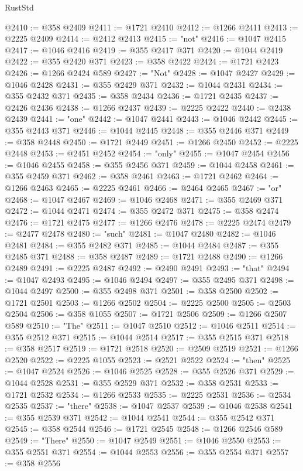\begin{lexlean}{RustStd}
\begin{coremodule}
@2410 := @358 @2409
@2411 := @1721 @2410
@2412 := @1266 @2411
@2413 := @2225 @2409
@2414 := @2412 @2413
@2415 := "not"
@2416 := @1047 @2415
@2417 := @1046 @2416
@2419 := @355 @2417 @371
@2420 := @1044 @2419
@2422 := @355 @2420 @371
@2423 := @358 @2422
@2424 := @1721 @2423
@2426 := @1266 @2424 @589
@2427 := "Not"
@2428 := @1047 @2427
@2429 := @1046 @2428
@2431 := @355 @2429 @371
@2432 := @1044 @2431
@2434 := @355 @2432 @371
@2435 := @358 @2434
@2436 := @1721 @2435
@2437 := @2426 @2436
@2438 := @1266 @2437
@2439 := @2225 @2422
@2440 := @2438 @2439
@2441 := "one"
@2442 := @1047 @2441
@2443 := @1046 @2442
@2445 := @355 @2443 @371
@2446 := @1044 @2445
@2448 := @355 @2446 @371
@2449 := @358 @2448
@2450 := @1721 @2449
@2451 := @1266 @2450
@2452 := @2225 @2448
@2453 := @2451 @2452
@2454 := "only"
@2455 := @1047 @2454
@2456 := @1046 @2455
@2458 := @355 @2456 @371
@2459 := @1044 @2458
@2461 := @355 @2459 @371
@2462 := @358 @2461
@2463 := @1721 @2462
@2464 := @1266 @2463
@2465 := @2225 @2461
@2466 := @2464 @2465
@2467 := "or"
@2468 := @1047 @2467
@2469 := @1046 @2468
@2471 := @355 @2469 @371
@2472 := @1044 @2471
@2474 := @355 @2472 @371
@2475 := @358 @2474
@2476 := @1721 @2475
@2477 := @1266 @2476
@2478 := @2225 @2474
@2479 := @2477 @2478
@2480 := "such"
@2481 := @1047 @2480
@2482 := @1046 @2481
@2484 := @355 @2482 @371
@2485 := @1044 @2484
@2487 := @355 @2485 @371
@2488 := @358 @2487
@2489 := @1721 @2488
@2490 := @1266 @2489
@2491 := @2225 @2487
@2492 := @2490 @2491
@2493 := "that"
@2494 := @1047 @2493
@2495 := @1046 @2494
@2497 := @355 @2495 @371
@2498 := @1044 @2497
@2500 := @355 @2498 @371
@2501 := @358 @2500
@2502 := @1721 @2501
@2503 := @1266 @2502
@2504 := @2225 @2500
@2505 := @2503 @2504
@2506 := @358 @1055
@2507 := @1721 @2506
@2509 := @1266 @2507 @589
@2510 := "The"
@2511 := @1047 @2510
@2512 := @1046 @2511
@2514 := @355 @2512 @371
@2515 := @1044 @2514
@2517 := @355 @2515 @371
@2518 := @358 @2517
@2519 := @1721 @2518
@2520 := @2509 @2519
@2521 := @1266 @2520
@2522 := @2225 @1055
@2523 := @2521 @2522
@2524 := "then"
@2525 := @1047 @2524
@2526 := @1046 @2525
@2528 := @355 @2526 @371
@2529 := @1044 @2528
@2531 := @355 @2529 @371
@2532 := @358 @2531
@2533 := @1721 @2532
@2534 := @1266 @2533
@2535 := @2225 @2531
@2536 := @2534 @2535
@2537 := "there"
@2538 := @1047 @2537
@2539 := @1046 @2538
@2541 := @355 @2539 @371
@2542 := @1044 @2541
@2544 := @355 @2542 @371
@2545 := @358 @2544
@2546 := @1721 @2545
@2548 := @1266 @2546 @589
@2549 := "There"
@2550 := @1047 @2549
@2551 := @1046 @2550
@2553 := @355 @2551 @371
@2554 := @1044 @2553
@2556 := @355 @2554 @371
@2557 := @358 @2556

\end{coremodule}
\end{lexlean}

